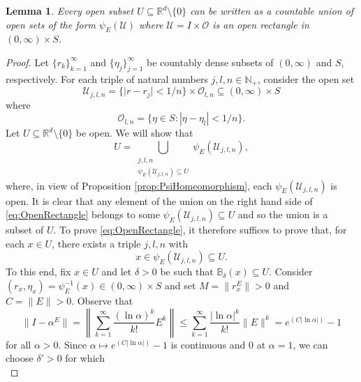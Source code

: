 \documentclass[11pt]{article}
\newtheorem{lemma}[theorem]{Lemma}
\theoremstyle{remark}
\begin{document}
\begin{lemma}\label{lem:OpenRectangle}
Every open subset $U\subseteq \mathbb{R}^d\setminus\{0\}$ can be written as a countable union of open sets of the form $\psi_E(\mathcal{U})$ where $\mathcal{U}=I\times\mathcal{O}$ is an open rectangle in $(0,\infty)\times S$.
\end{lemma}


\begin{proof}
Let $\{r_k\}_{k=1}^\infty$ and $\{\eta_j\}_{j=1}^\infty$ be countably dense subsets of $(0,\infty)$ and $S$, respectively.  For each triple of natural numbers $j,l,n\in\mathbb{N}_+$, consider the open set
\begin{equation*}
\mathcal{U}_{j,l,n}=\{ \vert r - r_j \vert < 1/n \}\times \mathcal{O}_{l,n}\subseteq (0,\infty)\times S
\end{equation*}
where
\begin{equation*}
\mathcal{O}_{l,n}=\{\eta\in S: |\eta-\eta_l|<1/n\}.
\end{equation*}
Let $U\subseteq \mathbb{R}^d\setminus \{0\}$ be open. We will show that
\begin{equation}\label{eq:OpenRectangle}
U=\bigcup_{\substack{j,l,n\\ \psi_E(\mathcal{U}_{j,l,n})\subseteq U}}\psi_E(\mathcal{U}_{j,l,n}),
\end{equation}
where, in view of Proposition \ref{prop:PsiHomeomorphism}, each $\psi_E(\mathcal{U}_{j,l,n})$ is open. It is clear that any element of the union on the right hand side of \eqref{eq:OpenRectangle} belongs to some $\psi_E(\mathcal{U}_{j,l,n}) \subseteq U$ and so the union is a subset of $U$. To prove \eqref{eq:OpenRectangle}, it therefore suffices to prove that, for each $x\in U$, there exists a triple $j,l,n$ with
\begin{equation*}
x\in\psi_E(\mathcal{U}_{j,l,n})\subseteq U.
\end{equation*}
To this end, fix $x\in U$ and let $\delta>0$ be such that $\mathbb{B}_\delta(x)\subseteq U$. Consider $(r_x,\eta_x)=\psi_E^{-1}(x)\in (0,\infty)\times S$ and set $M=\|r_x^E\|>0$ and $C=\|E\|>0$. Observe that 
\begin{equation*}
\|I-\alpha^E\|=\left\|\sum_{k=1}^\infty \frac{(\ln \alpha)^k}{k!} E^k\right\|\leq \sum_{k=1}^\infty \frac{|\ln \alpha|^k}{k!} \|E\|^k=e^{(C|\ln \alpha|)}-1
\end{equation*}
for all $\alpha>0$. Since $\alpha\mapsto e^{(C|\ln \alpha|)}-1$ is continuous and $0$ at $\alpha=1$, we can choose $\delta'>0$ for which
\begin{equation*}

\end{equation*}
\end{proof}
\end{document}
